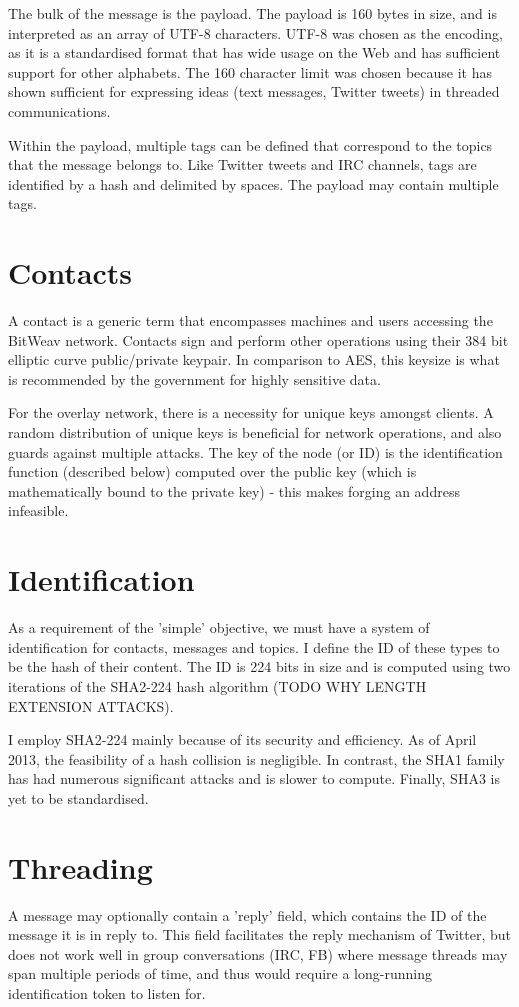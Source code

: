 \documentclass[10pt,a4paper,onecolumn]{article}
\begin{document}
The bulk of the message is the payload. The payload is 160 bytes in size, and is interpreted as an array of UTF-8 characters. UTF-8 was chosen as the encoding, as it is a standardised format that has wide usage on the Web and has sufficient support for other alphabets. The 160 character limit was chosen because it has shown sufficient for expressing ideas (text messages, Twitter tweets) in threaded communications. 

Within the payload, multiple tags can be defined that correspond to the topics that the message belongs to. Like Twitter tweets and IRC channels, tags are identified by a hash and delimited by spaces. The payload may contain multiple tags.

\section{Contacts}
A contact is a generic term that encompasses machines and users accessing the BitWeav network. Contacts sign and perform other operations using their 384 bit elliptic curve  public/private keypair. In comparison to AES, this keysize is what is recommended by the government for highly sensitive data.

For the overlay network, there is a necessity for unique keys amongst clients. A random distribution of unique keys is beneficial for network operations, and also guards against multiple attacks. The key of the node (or ID) is the identification function (described below) computed over the public key (which is mathematically bound to the private key) - this makes forging an address infeasible. 

\section{Identification}
As a requirement of the 'simple' objective, we must have a system of identification for contacts, messages and topics. I define the ID of these types to be the hash of their content. The ID is 224 bits in size and is computed using two iterations of the SHA2-224 hash algorithm (TODO WHY LENGTH EXTENSION ATTACKS).

I employ SHA2-224 mainly because of its security and efficiency. As of April 2013, the feasibility of a hash collision is negligible. In contrast, the SHA1 family has had numerous significant attacks and is slower to compute. Finally, SHA3 is yet to be standardised. 

\section{Threading}
A message may optionally contain a 'reply' field, which contains the ID of the message it is in reply to. This field facilitates the reply mechanism of Twitter, but does not work well in group conversations (IRC, FB) where message threads may span multiple periods of time, and thus would require a long-running identification token to listen for.
\end{document}

